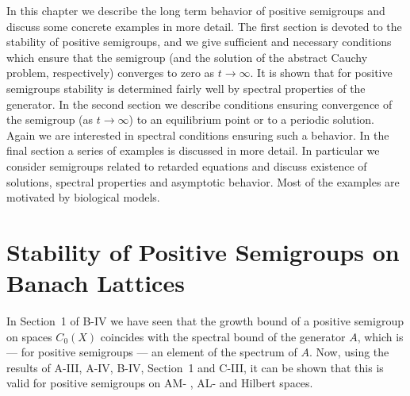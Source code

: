 \label{chap:c4}%
In this chapter we describe the long term behavior of positive semigroups and discuss some concrete examples in more detail.
The first section is devoted to the stability of positive semigroups, and we give sufficient and necessary conditions which ensure that the semigroup (and the solution of the abstract Cauchy problem, respectively) converges to zero as $t \to \infty$.
It is shown that for positive semigroups stability is determined fairly well by spectral properties of the generator.
In the second section we describe conditions ensuring convergence of the semigroup (as $t \to \infty$) to an equilibrium point or to a periodic solution.
Again we are interested in spectral conditions ensuring such a behavior.
In the final section a series of examples is discussed in more detail.
In particular we consider semigroups related to retarded equations and discuss existence of solutions, spectral properties and asymptotic behavior.
Most of the examples are motivated by biological models.

\section{Stability of Positive Semigroups on Banach Lattices}\label{c4-1}%
\hspace{1cm}{\Large by Frank Neubrander}
\vspace{.5cm}
\newline
In Section~1 of B-IV we have seen that the growth bound of a positive semigroup on spaces $C_{0}(X)$ coincides with the spectral bound of the generator $A$, which is --- for positive semigroups --- an element of the spectrum of $A$.
Now, using the results of A-III, A-IV, B-IV, Section~1 and C-III, it can be shown that this is valid for positive semigroups on AM- , AL- and Hilbert spaces.

